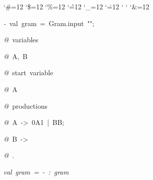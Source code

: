 \begin{list}{}
{\setlength{\leftmargin}{\leftmargini}
\setlength{\rightmargin}{0cm}
\setlength{\itemindent}{0cm}
\setlength{\listparindent}{0cm}
\setlength{\itemsep}{0cm}
\setlength{\parsep}{0cm}
\setlength{\labelsep}{0cm}
\setlength{\labelwidth}{0cm}
\catcode`\#=12
\catcode`\$=12
\catcode`\%=12
\catcode`\^=12
\catcode`\_=12
\catcode`\.=12
\catcode`
\catcode`
\catcode`\&=12
\ttfamily}
\small
\item[]\textsl{-\ }val\ gram\ =\ Gram.input\ "";
\item[]\textsl{@\ }variables
\item[]\textsl{@\ }A,\ B
\item[]\textsl{@\ }start\ variable
\item[]\textsl{@\ }A
\item[]\textsl{@\ }productions
\item[]\textsl{@\ }A\ ->\ 0A1\ |\ BB;
\item[]\textsl{@\ }B\ ->\ %
\item[]\textsl{@\ }.
\item[]\textsl{val\ gram\ =\ -\ :\ gram}
\end{list}
